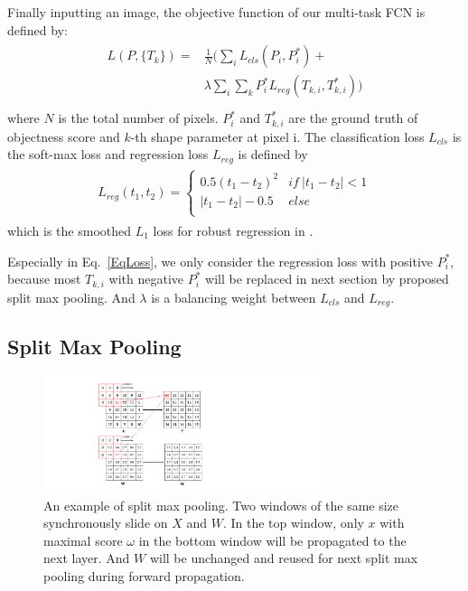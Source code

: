 Finally inputting an image, the objective function of our multi-task FCN is defined by:
\begin{eqnarray}\label{EqLoss}
\begin{aligned}
L(P,\{T_k\}) =& \frac{1}{N}(\sum_{i}L_{cls}(P_i,P^*_{i})+\\
&\lambda\sum_{i}\sum_{k}P^*_{i}L_{reg}(T_{k,i},T^*_{k,i}))\\
\end{aligned}
\end{eqnarray}
where $N$ is the total number of pixels.
$P^*_i$ and $T^*_{k,i}$ are the ground truth of objectness score and $k$-th shape parameter at pixel i.
The classification loss $L_{cls}$ is the soft-max loss and regression loss $L_{reg}$ is defined by
\begin{eqnarray}
\label{EqSmoothL1}
\begin{aligned}
L_{reg}(t_1,t_2) =\left\{\begin{array}{cc}
0.5(t_1-t_2)^2&if~|t_1-t_2|<1\\
|t_1-t_2|-0.5&else\\
\end{array}\right.
\end{aligned}
\end{eqnarray}
which is the smoothed $L_1$ loss for robust regression in \cite{Ren2015}.

Especially in Eq.~\ref{EqLoss}, we only consider the regression loss with positive $P^*_i$, because most $T_{k,i}$ with negative $P^*_i$ will be replaced in next section by proposed split max pooling.
And $\lambda$ is a balancing weight between $L_{cls}$ and $L_{reg}$.

\subsection{Split Max Pooling}
\label{sec:split-max-pooling}
\begin{figure}
    \begin{center}
        \includegraphics[width=3.2in]{figures/FigSMP.pdf}
    \end{center}
    \caption{An example of split max pooling.
        Two windows of the same size synchronously slide on $X$ and $W$.
        In the top window, only $x$ with maximal score $\omega$ in the bottom window will be propagated to the next layer.
        And $W$ will be unchanged and reused for next split max pooling during forward propagation.}
    \label{FigSMP}
\end{figure}

